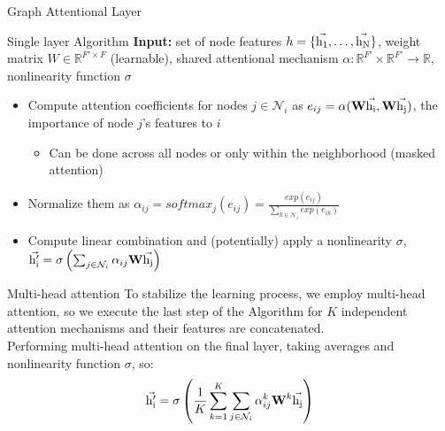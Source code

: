 \documentclass{beamer}
\theoremstyle{definition}
\begin{document}
\begin{frame}{Graph Attentional Layer}
    \begin{block}{Single layer Algorithm}
    \textbf{Input:} set of node features \(h=\{\vec{\rm h_{1}},\dots,\vec{\rm h_{N}}\}\), weight matrix \(W\in \mathbb{R}^{F'\times F}\) (learnable), shared attentional mechanism \(\alpha: \mathbb{R}^{F'}\times\mathbb{R}^{F'}\rightarrow \mathbb{R}\), nonlinearity function \(\sigma\)
    \begin{itemize}
        \item Compute attention coefficients for nodes \(j\in \mathcal{N}_{i}\) as \(e_{ij}=\alpha(\textbf{W}\vec{\rm h_{i}},\textbf{W}\vec{\rm h_{j}})\), the importance of node \(j\)'s features to \(i\)
            \begin{itemize}
                \item Can be done across all nodes or only within the neighborhood (masked attention)
            \end{itemize}
        \item Normalize them as \(\alpha_{ij}=softmax_{j}(e_{ij})=\frac{exp(e_{ij})}{\sum_{k\in\mathcal{N}_{i}}exp(e_{ik})}\)
        \item Compute linear combination and (potentially) apply a nonlinearity \(\sigma\), \(\vec{\rm h'_{i}}=\sigma\left(\sum_{j\in\mathcal{N}_{i}}\alpha_{ij}\textbf{W}\vec{\rm h_{j}}\right)\)
    \end{itemize}
    \end{block}
    
\end{frame}


\begin{frame}{Multi-head attention}
    To stabilize the learning process, we employ multi-head attention, so we execute the last step of the Algorithm for \(K\) independent attention mechanisms and their features are concatenated.\\
    \bigskip \pause
    Performing multi-head attention on the final layer, taking averages and nonlinearity function \(\sigma\), so:
    \[\vec{\rm h'_{i}}=\sigma\left(\frac{1}{K}\sum_{k=1}^{K}\sum_{j\in\mathcal{N}_{i}}\alpha_{ij}^k\textbf{W}^k\vec{\rm h_{j}}\right)\]
\end{frame}
\end{document}
